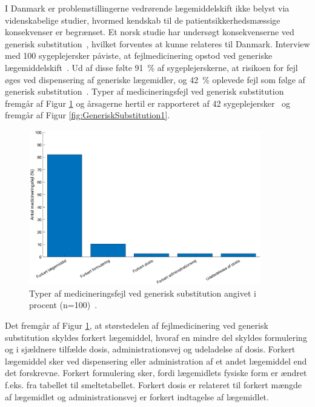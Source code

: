 I Danmark er problemstillingerne vedrørende lægemiddelskift ikke belyst via videnskabelige studier, hvormed kendskab til de patientsikkerhedsmæssige konsekvenser er begrænset. Et norsk studie har undersøgt konsekvenserne ved generisk substitution~\citep{Hakonsen2010}, hvilket forventes at kunne relateres til Danmark. Interview med 100 sygeplejersker påviste, at fejlmedicinering opstod ved generiske lægemiddelskift~\citep{Hakonsen2010}. Ud af disse følte 
91~\% af sygeplejerskerne, at risikoen for fejl øges ved dispensering af generiske lægemidler, og 42~\% oplevede fejl som følge af generisk substitution~\citep{Hakonsen2010}.
Typer af medicineringsfejl ved generisk substitution fremgår af Figur \ref{fig:GeneriskSubstitution} og årsagerne hertil er rapporteret af 42 sygeplejersker~\citep{Hakonsen2010} og fremgår af Figur \ref{fig:GeneriskSubstitution1}.

\begin{figure}[H]\centering	\includegraphics[width=0.9\textwidth]{billeder/GenSubb.png} 
	\caption{Typer af medicineringsfejl ved generisk substitution angivet i procent (n=100)~\citep{Hakonsen2010}.}
	\label{fig:GeneriskSubstitution}  
\end{figure}
\vspace{-0.5cm}

Det fremgår af Figur \ref{fig:GeneriskSubstitution}, at  størstedelen af fejlmedicinering ved generisk substitution skyldes forkert lægemiddel, hvoraf en mindre del skyldes formulering og i sjældnere tilfælde dosis, administrationsvej og udeladelse af dosis. Forkert lægemiddel sker ved dispensering eller administration af et andet lægemiddel end det forskrevne. Forkert formulering sker, fordi lægemidlets fysiske form er ændret f.eks. fra tabellet til smeltetabellet. Forkert dosis er relateret til forkert mængde af lægemidlet og administrationsvej er forkert indtagelse af lægemidlet. 

